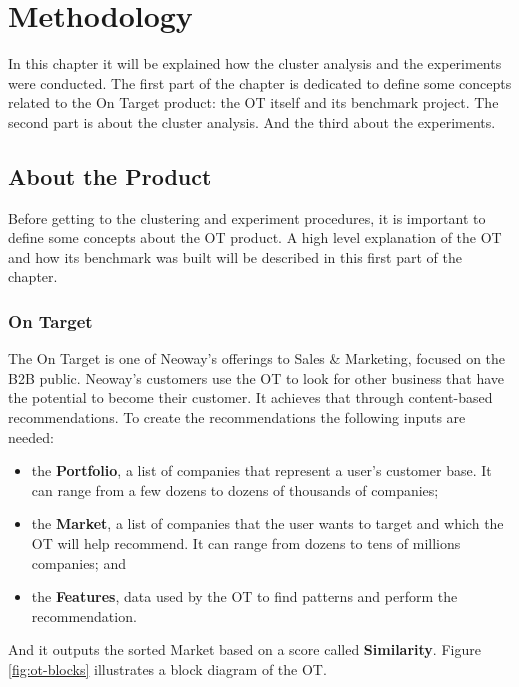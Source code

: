 \chapter{Methodology}
\label{ch:methodology}

In this chapter it will be explained how the cluster analysis and the experiments were conducted. The first part of the chapter is dedicated to define some concepts related to the On Target product: the OT itself and its benchmark project. The second part is about the cluster analysis. And the third about the experiments.

\section{About the Product}

Before getting to the clustering and experiment procedures, it is important to define some concepts about the OT product. A high level explanation of the OT and how its benchmark was built will be described in this first part of the chapter.

\subsection{On Target}

The On Target is one of Neoway's offerings to Sales \& Marketing, focused on the B2B public. Neoway's customers use the OT to look for other business that have the potential to become their customer. It achieves that through content-based recommendations. To create the recommendations the following inputs are needed:
\begin{itemize}
    \item the \textbf{Portfolio}, a list of companies that represent a user's customer base. It can range from a few dozens to dozens of thousands of companies;
    \item the \textbf{Market}, a list of companies that the user wants to target and which the OT will help recommend. It can range from dozens to tens of millions companies; and
    \item the \textbf{Features}, data used by the OT to find patterns and perform the recommendation.
\end{itemize}
And it outputs the sorted Market based on a score called \textbf{Similarity}. Figure \ref{fig:ot-blocks} illustrates a block diagram of the OT.

